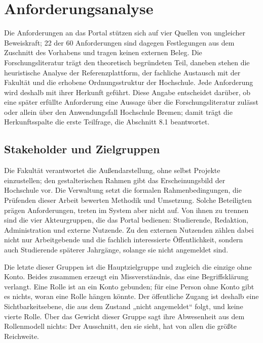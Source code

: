 
\chapter{Anforderungsanalyse}
\label{kap:anforderungsanalyse}

Die Anforderungen an das Portal stützen sich auf vier Quellen von ungleicher Beweiskraft; 22 der 60 Anforderungen sind dagegen Festlegungen aus dem Zuschnitt des Vorhabens und tragen keinen externen Beleg. Die Forschungsliteratur trägt den theoretisch begründeten Teil, daneben stehen die heuristische Analyse der Referenzplattform, der fachliche Austausch mit der Fakultät und die erhobene Ordnungsstruktur der Hochschule. Jede Anforderung wird deshalb mit ihrer Herkunft geführt. Diese Angabe entscheidet darüber, ob eine später erfüllte Anforderung eine Aussage über die Forschungsliteratur zulässt oder allein über den Anwendungsfall Hochschule Bremen; damit trägt die Herkunftsspalte die erste Teilfrage, die Abschnitt 8.1 beantwortet.

\section{Stakeholder und Zielgruppen}
\label{sec:stakeholder}

Die Fakultät verantwortet die Außendarstellung, ohne selbst Projekte einzustellen; den gestalterischen Rahmen gibt das Erscheinungsbild der Hochschule vor. Die Verwaltung setzt die formalen Rahmenbedingungen, die Prüfenden dieser Arbeit bewerten Methodik und Umsetzung. Solche Beteiligten prägen Anforderungen, treten im System aber nicht auf. Von ihnen zu trennen sind die vier Akteurgruppen, die das Portal bedienen: Studierende, Redaktion, Administration und externe Nutzende. Zu den externen Nutzenden zählen dabei nicht nur Arbeitgebende und die fachlich interessierte Öffentlichkeit, sondern auch Studierende späterer Jahrgänge, solange sie nicht angemeldet sind.

Die letzte dieser Gruppen ist die Hauptzielgruppe und zugleich die einzige ohne Konto. Beides zusammen erzeugt ein Missverständnis, das eine Begriffsklärung verlangt. Eine Rolle ist an ein Konto gebunden; für eine Person ohne Konto gibt es nichts, woran eine Rolle hängen könnte. Der öffentliche Zugang ist deshalb eine Sichtbarkeitsebene, die aus dem Zustand „nicht angemeldet“ folgt, und keine vierte Rolle. Über das Gewicht dieser Gruppe sagt ihre Abwesenheit aus dem Rollenmodell nichts: Der Ausschnitt, den sie sieht, hat von allen die größte Reichweite.

